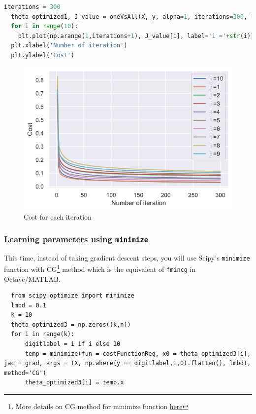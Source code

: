 \documentclass[12pt]{article}
\begin{document}
\begin{lstlisting}[language=Python]
  iterations = 300
  theta_optimized1, J_value = oneVsAll(X, y, alpha=1, iterations=300, lmbd=0.1, digitlabel=10)
  for i in range(10):
    plt.plot(np.arange(1,iterations+1), J_value[i], label='i ='+str(i))
  plt.xlabel('Number of iteration')
  plt.ylabel('Cost')
\end{lstlisting}

\begin{figure}[h!]
  \centering
  \includegraphics[scale=0.6]{gradientdescent.png}
  \caption{Cost for each iteration}
  \label{fig:gradientdescent}
\end{figure}

\subsubsection{Learning parameters using \texttt{minimize}}

This time, instead of taking gradient descent steps, you will use Scipy’s \texttt{minimize} function with CG\footnote{More details on CG method for minimize function \href{https://docs.scipy.org/doc/scipy/reference/optimize.minimize-cg.html#optimize-minimize-cg}{here}} method which is the equivalent of \texttt{fmincg} in
Octave/MATLAB.

\begin{lstlisting}
  from scipy.optimize import minimize
  lmbd = 0.1
  k = 10
  theta_optimized3 = np.zeros((k,n))
  for i in range(k):
      digitlabel = i if i else 10
      temp = minimize(fun = costFunctionReg, x0 = theta_optimized3[i],  jac = grad, args = (X, np.where(y == digitlabel,1,0).flatten(), lmbd), method='CG')
      theta_optimized3[i] = temp.x
\end{lstlisting}
\end{document}
